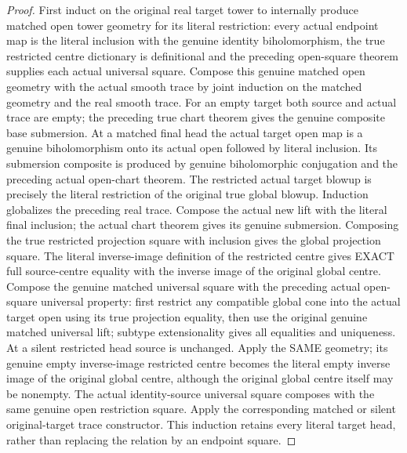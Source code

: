 \begin{proof}
First induct on the original real target tower to internally produce matched open tower geometry for its literal restriction: every actual endpoint map is the literal inclusion with the genuine identity biholomorphism, the true restricted centre dictionary is definitional and the preceding open-square theorem supplies each actual universal square. Compose this genuine matched open geometry with the actual smooth trace by joint induction on the matched geometry and the real smooth trace. For an empty target both source and actual trace are empty; the preceding true chart theorem gives the genuine composite base submersion. At a matched final head the actual target open map is a genuine biholomorphism onto its actual open followed by literal inclusion. Its submersion composite is produced by genuine biholomorphic conjugation and the preceding actual open-chart theorem. The restricted actual target blowup is precisely the literal restriction of the original true global blowup. Induction globalizes the preceding real trace. Compose the actual new lift with the literal final inclusion; the actual chart theorem gives its genuine submersion. Composing the true restricted projection square with inclusion gives the global projection square. The literal inverse-image definition of the restricted centre gives EXACT full source-centre equality with the inverse image of the original global centre. Compose the genuine matched universal square with the preceding actual open-square universal property: first restrict any compatible global cone into the actual target open using its true projection equality, then use the original genuine matched universal lift; subtype extensionality gives all equalities and uniqueness. At a silent restricted head source is unchanged. Apply the SAME geometry; its genuine empty inverse-image restricted centre becomes the literal empty inverse image of the original global centre, although the original global centre itself may be nonempty. The actual identity-source universal square composes with the same genuine open restriction square. Apply the corresponding matched or silent original-target trace constructor. This induction retains every literal target head, rather than replacing the relation by an endpoint square.
\end{proof}


